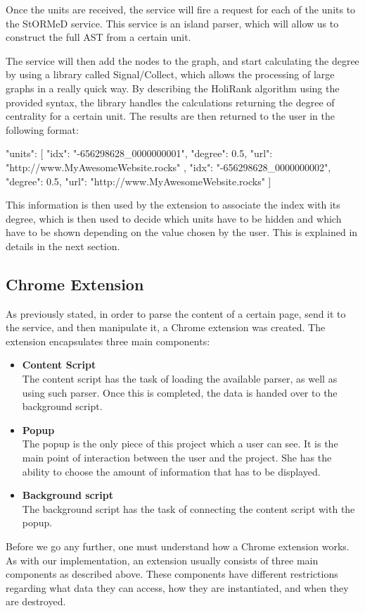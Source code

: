 Once the units are received, the service will fire a request for each of the units to the StORMeD\cite{Ponz2015b} service. This service is an island parser, which will allow us to construct the full AST from a certain unit. 

The service will then add the nodes to the graph, and start calculating the degree by using a library called Signal/Collect\cite{Stutz:2010:SGA:1940281.1940330}, which allows the processing of large graphs in a really quick way. By describing the HoliRank algorithm using the provided syntax, the library handles the calculations returning the degree of centrality for a certain unit. The results are then returned to the user in the following format:
\begin{jsoncode}
{
  "units": [
    {
      "idx": "-656298628_0000000001",
      "degree": 0.5,
      "url": "http://www.MyAwesomeWebsite.rocks"
    },
    {
      "idx": "-656298628_0000000002",
      "degree": 0.5,
      "url": "http://www.MyAwesomeWebsite.rocks"
    }
  ]
}
\end{jsoncode}

This information is then used by the extension to associate the index with its degree, which is then used to decide which units have to be hidden and which have to be shown depending on the value chosen by the user. This is explained in details in the next section.

\subsection{Chrome Extension}
As previously stated, in order to parse the content of a certain page, send it to the service, and then manipulate it, a Chrome extension was created. The extension encapsulates three main components:
\begin{itemize}
\item \textbf{Content Script}\\
The content script has the task of loading the available parser, as well as using such parser. Once this is completed, the data is handed over to the background script.
\item \textbf{Popup}\\
The popup is the only piece of this project which a user can see. It is the main point of interaction between the user and the project. She has the ability to choose the amount of information that has to be displayed. 
\item \textbf{Background script}\\
The background script has the task of connecting the content script with the popup. 
\end{itemize}
Before we go any further, one must understand how a Chrome extension works. As with our implementation, an extension usually consists of three main components as described above. These components have different restrictions regarding what data they can access, how they are instantiated, and when they are destroyed. 

